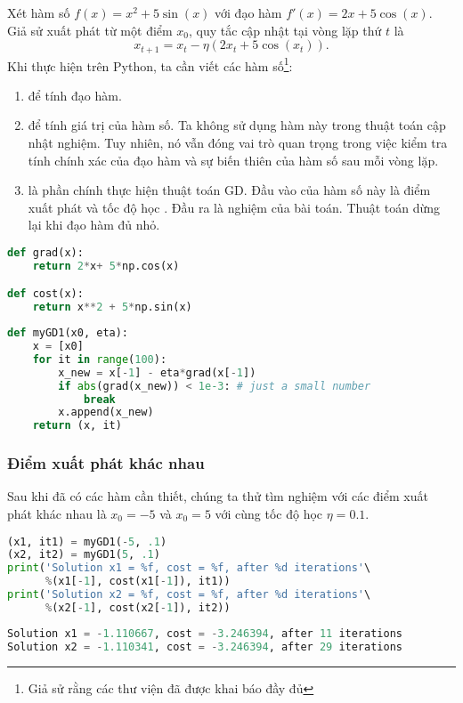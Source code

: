 Xét hàm số $f(x) = x^2 + 5\sin(x)$ với đạo hàm $f'(x) = 2x + 5\cos(x)$. Giả sử
xuất phát từ một điểm $x_{0}$, quy tắc cập nhật tại vòng lặp thứ $t$ là
\begin{equation}
x_{t+1} = x_t - \eta(2x_t + 5\cos(x_t)).
\end{equation}
Khi thực hiện trên Python, ta cần viết các hàm số\footnote{Giả sử rằng các thư
viện đã được khai báo đầy đủ}:
\begin{enumerate}
\item {} để tính đạo hàm.

\item  {} để tính giá trị của hàm số. Ta không sử dụng hàm này trong thuật toán cập nhật nghiệm. Tuy nhiên, nó vẫn đóng vai trò quan trọng trong việc kiểm tra tính chính xác của đạo hàm và sự biến thiên của hàm số sau mỗi vòng lặp.

\item {} là phần chính thực hiện thuật toán GD. Đầu vào
của hàm số này là điểm xuất phát  và tốc độ học
. Đầu ra là nghiệm của bài toán. Thuật toán dừng lại khi
đạo hàm đủ nhỏ.
\end{enumerate}


\begin{lstlisting}[language=Python]
def grad(x):
    return 2*x+ 5*np.cos(x)

def cost(x):
    return x**2 + 5*np.sin(x)
\end{lstlisting}

\begin{lstlisting}[language=Python]
def myGD1(x0, eta):
    x = [x0]
    for it in range(100):
        x_new = x[-1] - eta*grad(x[-1])
        if abs(grad(x_new)) < 1e-3: # just a small number
            break
        x.append(x_new)
    return (x, it)
\end{lstlisting}



\subsubsection{Điểm xuất phát khác nhau}

Sau khi đã có các hàm cần thiết, chúng ta thử tìm nghiệm với các điểm xuất phát
khác nhau là $x_{0} = -5$ và $x_{0} = 5$ với cùng tốc độ học $\eta = 0.1$.

\begin{lstlisting}[language=Python]
(x1, it1) = myGD1(-5, .1)
(x2, it2) = myGD1(5, .1)
print('Solution x1 = %f, cost = %f, after %d iterations'\ 
      %(x1[-1], cost(x1[-1]), it1))
print('Solution x2 = %f, cost = %f, after %d iterations'\
      %(x2[-1], cost(x2[-1]), it2))
\end{lstlisting}
\kq
\begin{lstlisting}[language=Python]
Solution x1 = -1.110667, cost = -3.246394, after 11 iterations
Solution x2 = -1.110341, cost = -3.246394, after 29 iterations
\end{lstlisting}

